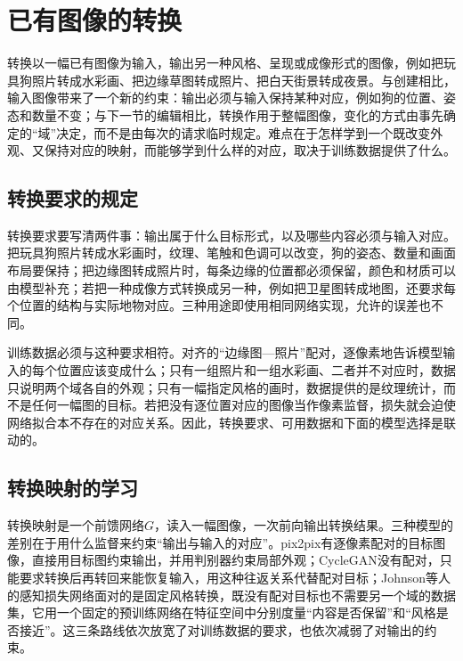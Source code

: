 \section{已有图像的转换}
\label{sec:vision-generation-translation}

转换以一幅已有图像为输入，输出另一种风格、呈现或成像形式的图像，例如把玩具狗照片转成水彩画、把边缘草图转成照片、把白天街景转成夜景。与创建相比，输入图像带来了一个新的约束：输出必须与输入保持某种对应，例如狗的位置、姿态和数量不变；与下一节的编辑相比，转换作用于整幅图像，变化的方式由事先确定的“域”决定，而不是由每次的请求临时规定。难点在于怎样学到一个既改变外观、又保持对应的映射，而能够学到什么样的对应，取决于训练数据提供了什么。

\subsection{转换要求的规定}
\label{sec:vision-generation-translation-requirements}

转换要求要写清两件事：输出属于什么目标形式，以及哪些内容必须与输入对应。把玩具狗照片转成水彩画时，纹理、笔触和色调可以改变，狗的姿态、数量和画面布局要保持；把边缘图转成照片时，每条边缘的位置都必须保留，颜色和材质可以由模型补充；若把一种成像方式转换成另一种，例如把卫星图转成地图，还要求每个位置的结构与实际地物对应。三种用途即使用相同网络实现，允许的误差也不同。

训练数据必须与这种要求相符。对齐的“边缘图—照片”配对，逐像素地告诉模型输入的每个位置应该变成什么；只有一组照片和一组水彩画、二者并不对应时，数据只说明两个域各自的外观；只有一幅指定风格的画时，数据提供的是纹理统计，而不是任何一幅图的目标。若把没有逐位置对应的图像当作像素监督，损失就会迫使网络拟合本不存在的对应关系。因此，转换要求、可用数据和下面的模型选择是联动的。

\subsection{转换映射的学习}
\label{sec:vision-generation-translation-mapping}

转换映射是一个前馈网络$G$，读入一幅图像，一次前向输出转换结果。三种模型的差别在于用什么监督来约束“输出与输入的对应”。pix2pix有逐像素配对的目标图像，直接用目标图约束输出，并用判别器约束局部外观；CycleGAN没有配对，只能要求转换后再转回来能恢复输入，用这种往返关系代替配对目标；Johnson等人的感知损失网络面对的是固定风格转换，既没有配对目标也不需要另一个域的数据集，它用一个固定的预训练网络在特征空间中分别度量“内容是否保留”和“风格是否接近”。这三条路线依次放宽了对训练数据的要求，也依次减弱了对输出的约束。

